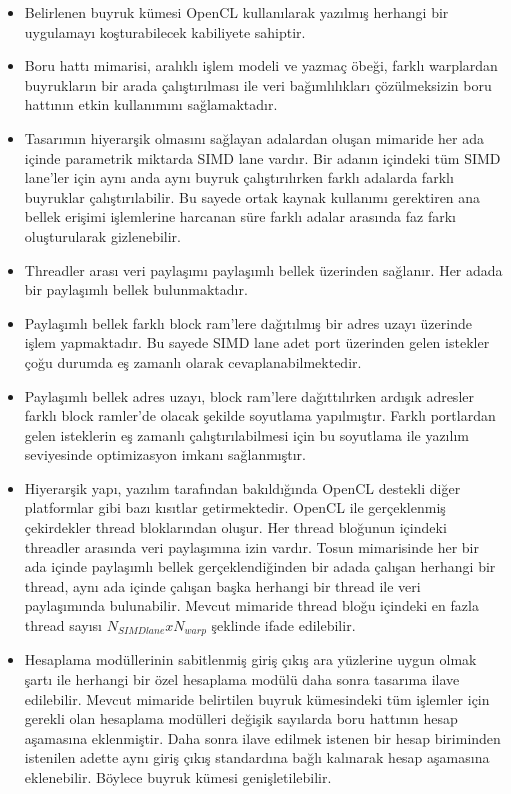 \begin{itemize}
\item Belirlenen buyruk kümesi OpenCL kullanılarak yazılmış herhangi bir uygulamayı koşturabilecek kabiliyete sahiptir. 
\item Boru hattı mimarisi, aralıklı işlem modeli ve yazmaç öbeği, farklı warplardan buyrukların bir arada çalıştırılması ile veri bağımlılıkları çözülmeksizin boru hattının etkin kullanımını sağlamaktadır.
\item Tasarımın hiyerarşik olmasını sağlayan adalardan oluşan mimaride her ada içinde parametrik miktarda SIMD lane vardır. Bir adanın içindeki tüm SIMD lane'ler için aynı anda aynı buyruk çalıştırılırken farklı adalarda farklı buyruklar çalıştırılabilir. Bu sayede ortak kaynak kullanımı gerektiren ana bellek erişimi işlemlerine harcanan süre farklı adalar arasında faz farkı oluşturularak gizlenebilir.
\item Threadler arası veri paylaşımı paylaşımlı bellek üzerinden sağlanır. Her adada bir paylaşımlı bellek bulunmaktadır.
\item Paylaşımlı bellek farklı block ram'lere dağıtılmış bir adres uzayı üzerinde işlem yapmaktadır. Bu sayede SIMD lane adet port üzerinden gelen istekler çoğu durumda eş zamanlı olarak cevaplanabilmektedir. 
\item Paylaşımlı bellek adres uzayı, block ram'lere dağıttılırken ardışık adresler farklı block ramler'de olacak şekilde soyutlama yapılmıştır. Farklı portlardan gelen isteklerin eş zamanlı çalıştırılabilmesi için bu soyutlama ile yazılım seviyesinde optimizasyon imkanı sağlanmıştır. 
\item Hiyerarşik yapı, yazılım tarafından bakıldığında OpenCL destekli diğer platformlar gibi bazı kısıtlar getirmektedir. OpenCL ile gerçeklenmiş çekirdekler thread bloklarından oluşur. Her thread bloğunun içindeki threadler arasında veri paylaşımına izin vardır. Tosun mimarisinde her bir ada içinde paylaşımlı bellek gerçeklendiğinden bir adada çalışan herhangi bir thread, aynı ada içinde çalışan başka herhangi bir thread ile veri paylaşımında bulunabilir. Mevcut mimaride thread bloğu içindeki en fazla thread sayısı $N_{SIMD lane} x N_{warp}$ şeklinde ifade edilebilir. 
\item Hesaplama modüllerinin sabitlenmiş giriş çıkış ara yüzlerine uygun olmak şartı ile herhangi bir özel hesaplama modülü daha sonra tasarıma ilave edilebilir. Mevcut mimaride belirtilen buyruk kümesindeki tüm işlemler için gerekli olan hesaplama modülleri değişik sayılarda boru hattının hesap aşamasına eklenmiştir. Daha sonra ilave edilmek istenen bir hesap biriminden istenilen adette aynı giriş çıkış standardına bağlı kalınarak hesap aşamasına eklenebilir. Böylece buyruk kümesi genişletilebilir. 
\end{itemize}   

